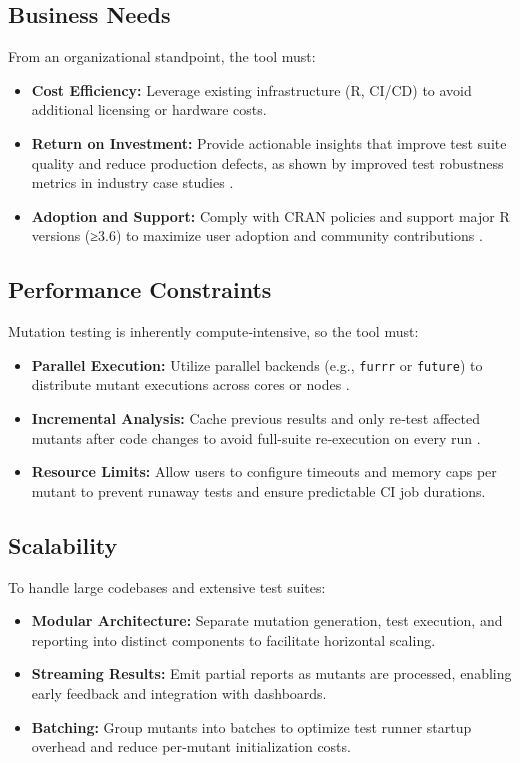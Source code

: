 \subsection{Business Needs}
From an organizational standpoint, the tool must:
\begin{itemize}
  \item \textbf{Cost Efficiency:} Leverage existing infrastructure (R, CI/CD) to avoid additional licensing or hardware costs.
  \item \textbf{Return on Investment:} Provide actionable insights that improve test suite quality and reduce production defects, as shown by improved test robustness metrics in industry case studies \cite{petrovic2018industrial}.
  \item \textbf{Adoption and Support:} Comply with CRAN policies and support major R versions (≥3.6) to maximize user adoption and community contributions \cite{R-base}.
\end{itemize}

\subsection{Performance Constraints}
Mutation testing is inherently compute‐intensive, so the tool must:
\begin{itemize}
  \item \textbf{Parallel Execution:} Utilize parallel backends (e.g., \texttt{furrr} or \texttt{future}) to distribute mutant executions across cores or nodes \cite{Vaughan2020furrr}.
  \item \textbf{Incremental Analysis:} Cache previous results and only re‐test affected mutants after code changes to avoid full-suite re‐execution on every run \cite{petrovic2018industrial}.
  \item \textbf{Resource Limits:} Allow users to configure timeouts and memory caps per mutant to prevent runaway tests and ensure predictable CI job durations.
\end{itemize}

\subsection{Scalability}
To handle large codebases and extensive test suites:
\begin{itemize}
  \item \textbf{Modular Architecture:} Separate mutation generation, test execution, and reporting into distinct components to facilitate horizontal scaling.
  \item \textbf{Streaming Results:} Emit partial reports as mutants are processed, enabling early feedback and integration with dashboards.
  \item \textbf{Batching:} Group mutants into batches to optimize test runner startup overhead and reduce per‐mutant initialization costs.
\end{itemize}

